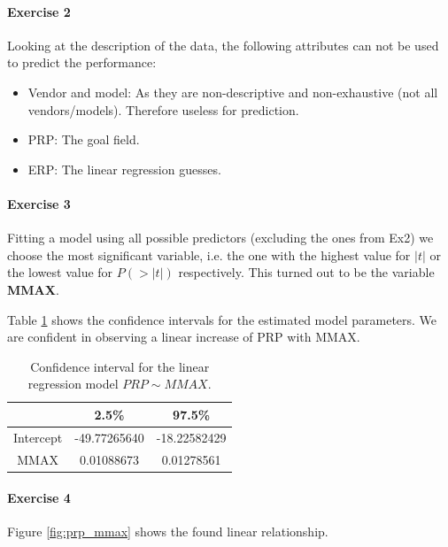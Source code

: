 \documentclass{paper}
\begin{document}
\paragraph{Exercise 2}
Looking at the description of the data, the following attributes can not be used to predict the performance:
\begin{itemize}
\item Vendor and model: As they are non-descriptive and non-exhaustive (not all vendors/models). Therefore useless for prediction.
\item PRP: The goal field.
\item ERP: The linear regression guesses.
\end{itemize}

\paragraph{Exercise 3}

Fitting a model using all possible predictors (excluding the ones from Ex2)
we choose the most significant variable, i.e. the one with the highest value
for $|t|$ or the lowest value for $P(>|t|)$ respectively. This turned out to be
the variable \textbf{MMAX}.

Table \ref{tab:confRPR} shows the confidence intervals for the estimated model
parameters. We are confident in observing a linear increase of PRP with MMAX.

\begin{table}[!h]
  \centering
    \caption{Confidence interval for the linear regression model $PRP\sim MMAX$.}
    \label{tab:confRPR}
    \begin{tabular}{|c|c|c|}
      \hline
                      & 2.5\%         & 97.5\%          \\ \hline
      Intercept       & -49.77265640  & -18.22582429    \\ \hline
      MMAX            & 0.01088673    & 0.01278561      \\ \hline
    \end{tabular}
\end{table}


\paragraph{Exercise 4}

Figure \ref{fig:prp_mmax} shows the found linear relationship.
\end{document}
